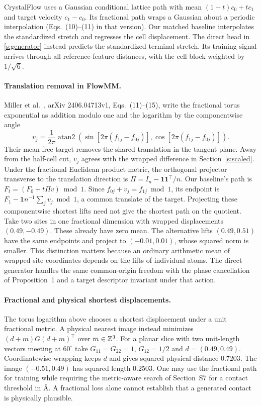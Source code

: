 CrystalFlow uses a Gaussian conditional lattice path with mean $(1-t)c_0+tc_1$ and target velocity $c_1-c_0$. Its fractional path wraps a Gaussian about a periodic interpolation (Eqs.~(10)--(11) in that version). Our matched baseline interpolates the standardized stretch and regresses the cell displacement. The direct head in \eqref{s:generator} instead predicts the standardized terminal stretch. Its training signal arrives through all reference-feature distances, with the cell block weighted by $1/\sqrt6$.

\newpage
\paragraph{Translation removal in FlowMM.}
Miller et al.\ \cite{flowmm}, arXiv 2406.04713v1, Eqs.~(11)--(15), write the fractional torus exponential as addition modulo one and the logarithm by the componentwise angle
\[
 v_j=\frac{1}{2\pi}\operatorname{atan2}\!\left(\sin[2\pi(f_{1j}-f_{0j})],
                                       \cos[2\pi(f_{1j}-f_{0j})]\right).
\]
Their mean-free target removes the shared translation in the tangent plane. Away from the half-cell cut, $v_j$ agrees with the wrapped difference in Section~\ref{s:scaled}. Under the fractional Euclidean product metric, the orthogonal projector transverse to the translation direction is $\Pi=I_n-\mathbf1\mathbf1^\top/n$. Our baseline's path is $F_t=(F_0+t\Pi v)\bmod1$. Since $f_{0j}+v_j=f_{1j}\bmod1$, its endpoint is $F_1-\mathbf1 n^{-1}\sum_jv_j\bmod1$, a common translate of the target. Projecting these componentwise shortest lifts need not give the shortest path on the quotient. Take two sites in one fractional dimension with wrapped displacements $(0.49,-0.49)$. These already have zero mean. The alternative lifts $(0.49,0.51)$ have the same endpoints and project to $(-0.01,0.01)$, whose squared norm is smaller. This distinction matters because an ordinary arithmetic mean of wrapped site coordinates depends on the lifts of individual atoms. The direct generator handles the same common-origin freedom with the phase cancellation of Proposition~1 and a target descriptor invariant under that action.

\paragraph{Fractional and physical shortest displacements.}
The torus logarithm above chooses a shortest displacement under a unit fractional metric. A physical nearest image instead minimizes $(d+m)G(d+m)^\top$ over $m\in\mathbb Z^3$. For a planar slice with two unit-length vectors meeting at $60^\circ$ take $G_{11}=G_{22}=1$, $G_{12}=1/2$ and $d=(0.49,0.49)$. Coordinatewise wrapping keeps $d$ and gives squared physical distance $0.7203$. The image $(-0.51,0.49)$ has squared length $0.2503$. One may use the fractional path for training while requiring the metric-aware search of Section~S7 for a contact threshold in \AA. A fractional loss alone cannot establish that a generated contact is physically plausible.

